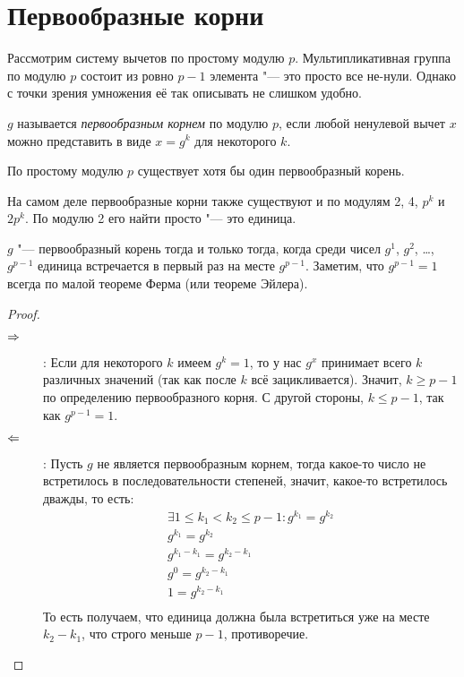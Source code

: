 \section{Первообразные корни}

Рассмотрим систему вычетов по простому модулю $p$.
Мультипликативная группа по модулю $p$ состоит из ровно $p-1$ элемента "--- это просто все не-нули.
Однако с точки зрения умножения её так описывать не слишком удобно.

\begin{Def}
$g$ называется \textit{первообразным корнем} по модулю $p$, если любой ненулевой вычет $x$ можно представить в виде $x=g^k$ для некоторого $k$.
\end{Def}

\begin{theorem}\label{PrimitiveRootExists}
По простому модулю $p$ существует хотя бы один первообразный корень.
\end{theorem}
\begin{Rem}
На самом деле первообразные корни также существуют и по модулям 2, 4, $p^k$ и $2p^k$.
По модулю 2 его найти просто "--- это единица.
\end{Rem}

\begin{theorem}\label{PrimitiveRootIff}
$g$ "--- первообразный корень тогда и только тогда, когда среди чисел $g^1$, $g^2$, \dots, $g^{p-1}$ единица встречается в первый раз на месте $g^{p-1}$.
Заметим, что $g^{p-1}=1$ всегда по малой теореме Ферма (или теореме Эйлера).
\end{theorem}
\begin{proof}
\begin{description}
\item[$\Rightarrow$]:
	Если для некоторого $k$ имеем $g^k=1$, то у нас $g^x$ принимает всего $k$ различных значений (так как после $k$ всё зацикливается).
	Значит, $k \ge p - 1$ по определению первообразного корня.
	С другой стороны, $k \le p - 1$, так как $g^{p-1}=1$.
\item[$\Leftarrow$]:
	Пусть $g$ не является первообразным корнем, тогда какое-то число не встретилось в последовательности степеней, значит, какое-то встретилось дважды,
	то есть:
	\begin{gather*}
	\exists 1 \le k_1 < k_2 \le p - 1\colon g^{k_1} = g^{k_2} \\
	g^{k_1} = g^{k_2} \\
	g^{k_1-k_1}= g^{k_2-k_1} \\
	g^0 = g^{k_2-k_1} \\
	1 = g^{k_2-k_1} \\
	\end{gather*}
	То есть получаем, что единица должна была встретиться уже на месте $k_2-k_1$, что строго меньше $p-1$, противоречие.
\end{description}
\end{proof}

